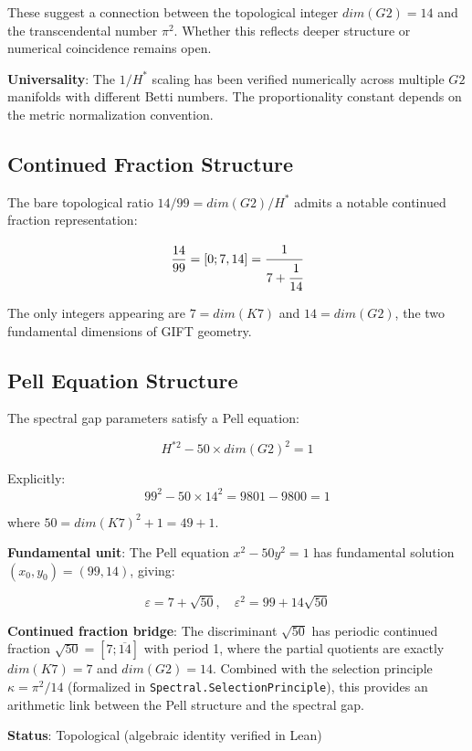 \documentclass[11pt,a4paper]{article}
\newcommand{\Gtwo}{\mathrm{G}_2}
\newcommand{\Kseven}{K_7}
\newcommand{\dimE}{\mathrm{dim}}
\newcommand{\topomark}{\textsc{Topological}}
\def\Gtwo{G2}%
\def\Kseven{K7}%
\def\dimE{dim}%
\def\topomark{Topological}%
\begin{document}
These suggest a connection between the topological integer $\dimE(\Gtwo) = 14$ and the transcendental number $\pi^2$. Whether this reflects deeper structure or numerical coincidence remains open.

\textbf{Universality}: The $1/H^*$ scaling has been verified numerically across multiple $\Gtwo$ manifolds with different Betti numbers. The proportionality constant depends on the metric normalization convention.

\subsection{Continued Fraction Structure}

The bare topological ratio $14/99 = \dimE(\Gtwo)/H^*$ admits a notable continued fraction representation:

$$\frac{14}{99} = [0; 7, 14] = \cfrac{1}{7 + \cfrac{1}{14}}$$

The only integers appearing are \textbf{$7 = \dimE(\Kseven)$} and \textbf{$14 = \dimE(\Gtwo)$}, the two fundamental dimensions of GIFT geometry.

\subsection{Pell Equation Structure}

The spectral gap parameters satisfy a Pell equation:

$$\boxed{H^{*2} - 50 \times \dimE(\Gtwo)^2 = 1}$$

Explicitly:
$$99^2 - 50 \times 14^2 = 9801 - 9800 = 1$$

where $50 = \dimE(\Kseven)^2 + 1 = 49 + 1$.

\textbf{Fundamental unit}: The Pell equation $x^2 - 50y^2 = 1$ has fundamental solution $(x_0, y_0) = (99, 14)$, giving:

$$\varepsilon = 7 + \sqrt{50}, \quad \varepsilon^2 = 99 + 14\sqrt{50}$$

\textbf{Continued fraction bridge}: The discriminant $\sqrt{50}$ has periodic continued fraction $\sqrt{50} = [7; \overline{14}]$ with period 1, where the partial quotients are exactly $\dimE(\Kseven) = 7$ and $\dimE(\Gtwo) = 14$. Combined with the selection principle $\kappa = \pi^2/14$ (formalized in \texttt{Spectral.SelectionPrinciple}), this provides an arithmetic link between the Pell structure and the spectral gap.

\textbf{Status}: \topomark{} (algebraic identity verified in Lean)
\end{document}
